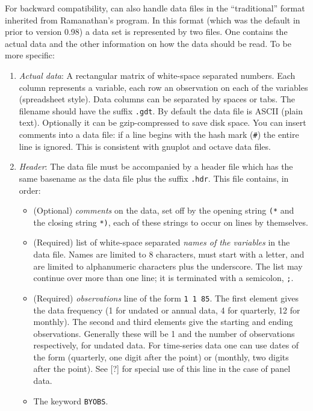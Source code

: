 For backward compatibility,  can also handle data files in
the ``traditional'' format inherited from Ramanathan's 
program.  In this format (which was the default in  prior
to version 0.98) a data set is represented by two files.  One contains
the actual data and the other information on how the data should be
read.  To be more specific:
\begin{enumerate}
\item \emph{Actual data}: A rectangular matrix of white-space
  separated numbers.  Each column represents a variable, each row an
  observation on each of the variables (spreadsheet style). Data
  columns can be separated by spaces or tabs. The filename should have
  the suffix \verb+.gdt+.  By default the data file is ASCII (plain
  text).  Optionally it can be gzip-compressed to save disk space. You
  can insert comments into a data file: if a line begins with the hash
  mark (\verb+#+) the entire line is ignored. This is consistent with
  gnuplot and octave data files.
\item \emph{Header}: The data file must be accompanied by a header
  file which has the same basename as the data file plus the suffix
  \verb+.hdr+.  This file contains, in order:
  \begin{itemize}
  \item (Optional) \emph{comments} on the data, set off by the opening
    string \verb+(*+ and the closing string \verb+*)+, each of these
    strings to occur on lines by themselves.
  \item (Required) list of white-space separated \emph{names of the
      variables} in the data file. Names are limited to 8 characters,
    must start with a letter, and are limited to alphanumeric
    characters plus the underscore.  The list may continue over more
    than one line; it is terminated with a semicolon, \verb+;+.
  \item (Required) \emph{observations} line of the form \verb+1 1 85+.
    The first element gives the data frequency (1 for undated or
    annual data, 4 for quarterly, 12 for monthly).  The second and
    third elements give the starting and ending observations.
    Generally these will be 1 and the number of observations
    respectively, for undated data.  For time-series data one can use
    dates of the form  (quarterly, one digit after the
    point) or  (monthly, two digits after the point). See
    [?] for special use of this line in the case of panel data.
  \item The keyword \verb+BYOBS+.
  \end{itemize}


\end{enumerate}

